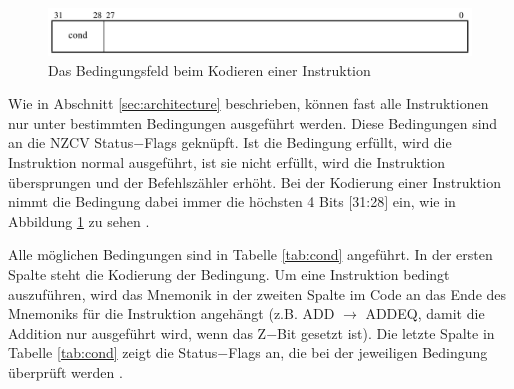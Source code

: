 \documentclass[a4paper, 11pt, onecolumn]{article}
\begin{document}
\begin{figure}[!htb]
\centering
\includegraphics[width=1\textwidth]{data/cond}
\caption[Kodierung der Bedingung]{Das Bedingungsfeld beim Kodieren einer Instruktion \cite{arm:2005}}
\label{fig:cond}
\end{figure}

Wie in Abschnitt \ref{sec:architecture} beschrieben, können fast alle Instruktionen nur unter bestimmten Bedingungen ausgeführt werden. Diese Bedingungen sind an die NZCV Status$-$Flags geknüpft. Ist die Bedingung erfüllt, wird die Instruktion normal ausgeführt, ist sie nicht erfüllt, wird die Instruktion übersprungen und der Befehlszähler erhöht. Bei der Kodierung einer Instruktion nimmt die Bedingung dabei immer die höchsten 4 Bits $[$31:28$]$ ein, wie in Abbildung \ref{fig:cond} zu sehen \cite{arm:2005}.



Alle möglichen Bedingungen sind in Tabelle \ref{tab:cond} angeführt. In der ersten Spalte steht die Kodierung der Bedingung. Um eine Instruktion bedingt auszuführen, wird das Mnemonik in der zweiten Spalte im Code an das Ende des Mnemoniks für die Instruktion angehängt (z.B. ADD $\rightarrow$ ADDEQ, damit die Addition nur ausgeführt wird, wenn das Z$-$Bit gesetzt ist). Die letzte Spalte in Tabelle \ref{tab:cond} zeigt die Status$-$Flags an, die bei der jeweiligen Bedingung überprüft werden \cite{arm:2005}. \\ \\
\end{document}
